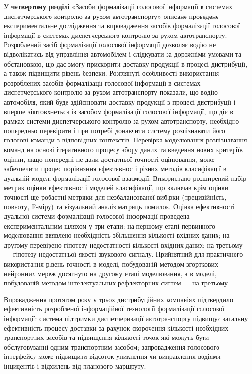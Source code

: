 У \textbf{четвертому розділі} «Засоби формалізації голосової інформації в системах диспетчерського контролю за рухом автотранспорту» описане проведене експериментальне дослідження та впровадження засобів формалізації голосової інформації в системах диспетчерського контролю за рухом автотранспорту.
Розроблений засіб формалізації голосової інформації дозволяє водію не відволікатись від управління автомобілем і слідкувати за дорожніми умовами та обстановкою, що дає змогу прискорити доставку продукції в процесі дистрибуції, а також підвищити рівень безпеки.
Розглянуті особливості використання розроблених засобів формалізації голосової інформації в системах диспетчерського контролю за рухом автотранспорту показали, що водію автомобіля, який буде здійснювати доставку продукції в процесі дистрибуції і вперше зіштовхнеться із засобом формалізації голосової інформації, що діє в рамках системи диспетчерського контролю за рухом автотранспорту, необхідно попередньо перевірити і при потребі донавчити систему розпізнавати його голосові команди з відповідних контекстів.
Перевірка моделювання розпізнавання команд на основі ітеративного процесу збору даних та введення нових критеріїв оцінки, якщо попередні не дали достатньої точності оцінювання, може забезпечити процес порівняння ефективності різних методів класифікації в дуальній моделі формалізації голосової взаємодії.
Використано розширений набір метрик оцінки ефективності моделей класифікації, що включав крім оцінки точності ще робастні метрики для незбалансованої вибірки (прецизійність, повноту, F-міру) та візуальний аналіз матриць помилок.
Оцінка ефективності дуальної системи формалізації голосової інформації проведена експериментальним шляхом у три етапи: на першому етапі первинного моделювання виявлено необхідність збільшення кількості вхідних даних; на другому перевірено гіпотезу недостатності кількості вхідних даних; на третьому --- гіпотезу недостатньої якості звукового сигналу. Прийнятний для практичного використання рівень точності в моделі, побудованій методом згорткових нейронних мереж досягнуто на другому етапі моделювання, а в моделі, побудованій методом інтелектуальних рефлекторних систем --- на третьому.

Впровадження протягом року у трьох дистрибуційних компаніях підтвердило ефективність розробленої інформаційної технології формалізації голосової інформації: система підтримки диспетчеризації автотранспорту підвищує загальну ефективність процесу доставки за рахунок скорочення кількості необхідних транспортних засобів та підвищення кількості точок які можуть бути обслуговуванні одним транспортним засобом; запровадження голосового інтерфейсу може підвищити відсоток уникнення чи виправлення водіями інцидентів і відхилень від планового маршруту.

